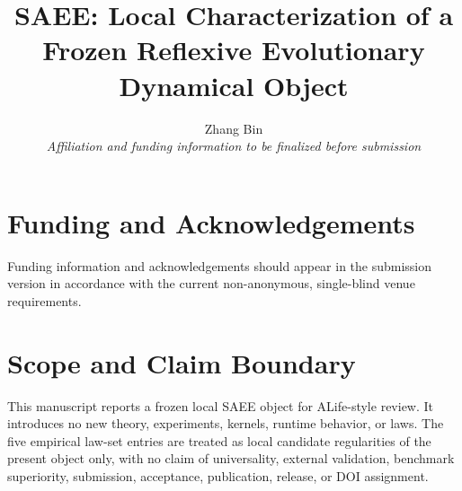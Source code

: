 \documentclass[10pt]{article}
\title{SAEE: Local Characterization of a Frozen Reflexive Evolutionary Dynamical Object}
\author{Zhang Bin\\\textit{Affiliation and funding information to be finalized before submission}}
\date{}
\begin{document}
\maketitle

\begin{abstract}

\end{abstract}









\section*{Funding and Acknowledgements}
Funding information and acknowledgements should appear in the submission
version in accordance with the current non-anonymous, single-blind venue
requirements.

\section*{Scope and Claim Boundary}
This manuscript reports a frozen local SAEE object for ALife-style review. It
introduces no new theory, experiments, kernels, runtime behavior, or laws. The
five empirical law-set entries are treated as local candidate regularities of
the present object only, with no claim of universality, external validation,
benchmark superiority, submission, acceptance, publication, release, or DOI
assignment.
\end{document}
